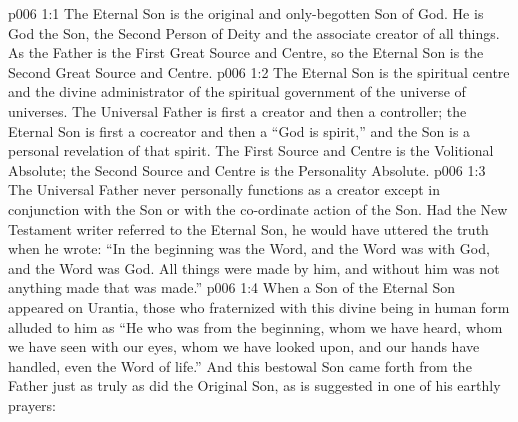 \vs p006 1:1 The Eternal Son is the original and only\hyp{}begotten Son of God. He is God the Son, the Second Person of Deity and the associate creator of all things. As the Father is the First Great Source and Centre, so the Eternal Son is the Second Great Source and Centre.
\vs p006 1:2 The Eternal Son is the spiritual centre and the divine administrator of the spiritual government of the universe of universes. The Universal Father is first a creator and then a controller; the Eternal Son is first a cocreator and then a  “God is spirit,” and the Son is a personal revelation of that spirit. The First Source and Centre is the Volitional Absolute; the Second Source and Centre is the Personality Absolute.
\vs p006 1:3 The Universal Father never personally functions as a creator except in conjunction with the Son or with the co\hyp{}ordinate action of the Son. Had the New Testament writer referred to the Eternal Son, he would have uttered the truth when he wrote: “In the beginning was the Word, and the Word was with God, and the Word was God. All things were made by him, and without him was not anything made that was made.”
\vs p006 1:4 When a Son of the Eternal Son appeared on Urantia, those who fraternized with this divine being in human form alluded to him as “He who was from the beginning, whom we have heard, whom we have seen with our eyes, whom we have looked upon, and our hands have handled, even the Word of life.” And this bestowal Son came forth from the Father just as truly as did the Original Son, as is suggested in one of his earthly prayers: 

